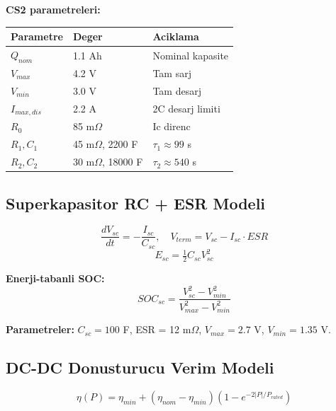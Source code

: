 \documentclass[11pt,a4paper]{article}
\begin{document}
\textbf{CS2 parametreleri:}
\begin{center}
\begin{tabular}{lll}
\toprule
Parametre & Deger & Aciklama \\
\midrule
$Q_{nom}$ & 1.1 Ah & Nominal kapasite \\
$V_{max}$ & 4.2 V & Tam sarj \\
$V_{min}$ & 3.0 V & Tam desarj \\
$I_{max,dis}$ & 2.2 A & 2C desarj limiti \\
$R_0$ & 85 m$\Omega$ & Ic direnc \\
$R_1, C_1$ & 45 m$\Omega$, 2200 F & $\tau_1 \approx 99$ s \\
$R_2, C_2$ & 30 m$\Omega$, 18000 F & $\tau_2 \approx 540$ s \\
\bottomrule
\end{tabular}
\end{center}

\subsection{Superkapasitor RC + ESR Modeli}

\[
\frac{dV_{sc}}{dt} = -\frac{I_{sc}}{C_{sc}}, \quad V_{term} = V_{sc} - I_{sc} \cdot ESR
\]
\[
E_{sc} = \tfrac{1}{2} C_{sc} V_{sc}^2
\]

\textbf{Enerji-tabanli SOC:}
\[
\boxed{\;SOC_{sc} = \frac{V_{sc}^2 - V_{min}^2}{V_{max}^2 - V_{min}^2}\;}
\]

\textbf{Parametreler:} $C_{sc} = 100$ F, ESR = 12 m$\Omega$, $V_{max} = 2.7$ V, $V_{min} = 1.35$ V.

\subsection{DC-DC Donusturucu Verim Modeli}

\[
\eta(P) = \eta_{min} + (\eta_{nom} - \eta_{min})(1 - e^{-2|P|/P_{rated}})
\]

\begin{center}
\end{center}
\end{document}
